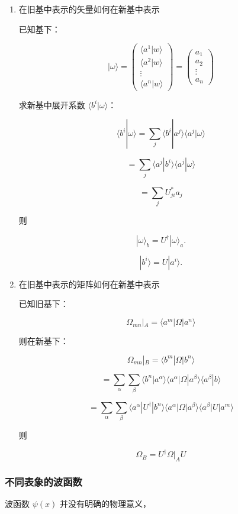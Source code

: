 \documentclass[lang=cn,15pt]{elegantbook}
\begin{document}
\begin{enumerate}
	\item 在旧基中表示的矢量如何在新基中表示
	
	已知基下： 
	
	\[
	| \omega \rangle = \begin{pmatrix} \langle a^{1} | w \rangle \\ \langle a^{2} | w \rangle \\ \vdots \\ \langle a^{n} | w \rangle \end{pmatrix} = \begin{pmatrix} a_1 \\ a_2 \\ \vdots \\ a_n \end{pmatrix}
	\]
	
	求新基中展开系数 $\langle b^{i} | \omega \rangle$：
	
	\[
	\langle b^{i} | \omega \rangle = \sum_j \langle b^{i} | a^{j} \rangle \langle a^{j} | \omega \rangle
	\]
	
	\[
	= \sum_j \langle a^{j} | b^{i} \rangle \langle a^{j} | \omega \rangle
	\]
	
	\[
	= \sum_j U_{ji}^* a_j
	\]
	

	
	则 
	
	\[
	|  \omega \rangle_b = U^{\dagger} | \omega \rangle_a.
	\]
	
		\[
	|  b^i \rangle = U | a^i \rangle.
	\]
	
	\item 在旧基中表示的矩阵如何在新基中表示
	
	已知旧基下：
	
	\[
	\Omega_{mn} | _A  = \langle a^{m} | \Omega | a^{n} \rangle
	\]
	
	则在新基下：
	
	\[
	\Omega_{mn} |_B = \langle b^{m} | \Omega | b^{n} \rangle
	\]
	
	\[
	= \sum_{\alpha} \sum_{\beta} \langle b^{n} | a^{\alpha} \rangle \langle a^{\alpha} | \Omega | a^{\beta} \rangle \langle a^{\beta} | b \rangle
	\]
	
	\[
	= \sum_{\alpha} \sum_{\beta} \langle a^{\alpha} | U^{\dagger} | b^{n} \rangle \langle a^{\alpha} | \Omega | a^{\beta} \rangle \langle a^{\beta} | U | a^{m} \rangle
	\]
	
	则 
	
	\[
	 \Omega _B = U^{\dagger} \Omega|_A U
	\]
\end{enumerate}
\subsubsection{不同表象的波函数}
波函数 $\psi(x)$ 并没有明确的物理意义， 
\end{document}
